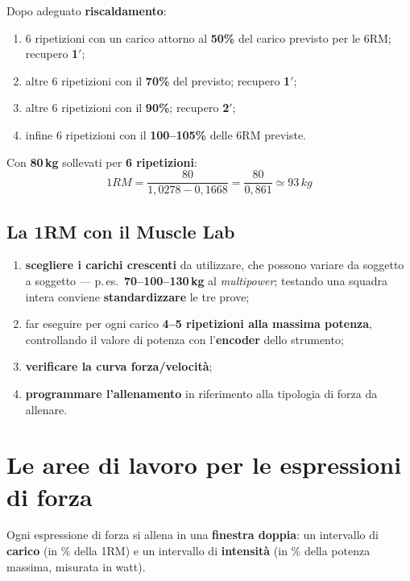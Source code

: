 Dopo adeguato \textbf{riscaldamento}:
\begin{enumerate}
  \item 6 ripetizioni con un carico attorno al \textbf{50\%} del carico previsto per le 6RM;
    recupero \textbf{1$'$};
  \item altre 6 ripetizioni con il \textbf{70\%} del previsto; recupero \textbf{1$'$};
  \item altre 6 ripetizioni con il \textbf{90\%}; recupero \textbf{2$'$};
  \item infine 6 ripetizioni con il \textbf{100--105\%} delle 6RM previste.
\end{enumerate}

Con \textbf{80\,kg} sollevati per \textbf{6 ripetizioni}:
\[
  1RM = \frac{80}{1{,}0278 - 0{,}1668} = \frac{80}{0{,}861} \simeq 93\,kg
\]

\subsection{La 1RM con il Muscle Lab}

\begin{enumerate}
  \item \textbf{scegliere i carichi crescenti} da utilizzare, che possono variare da soggetto a
    soggetto --- p.\,es.\ \textbf{70--100--130\,kg} al \textit{multipower}; testando una squadra
    intera conviene \textbf{standardizzare} le tre prove;
  \item far eseguire per ogni carico \textbf{4--5 ripetizioni alla massima potenza}, controllando il
    valore di potenza con l'\textbf{encoder} dello strumento;
  \item \textbf{verificare la curva forza/velocità};
  \item \textbf{programmare l'allenamento} in riferimento alla tipologia di forza da allenare.
\end{enumerate}

\section{Le aree di lavoro per le espressioni di forza}

Ogni espressione di forza si allena in una \textbf{finestra doppia}: un intervallo di \textbf{carico}
(in \% della 1RM) e un intervallo di \textbf{intensità} (in \% della potenza massima, misurata in
watt).

